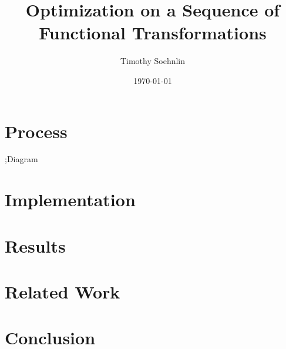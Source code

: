 \documentclass{article}
\title{Optimization on a Sequence of Functional Transformations}
\author{Timothy Soehnlin}
\date{\today}
\begin{document}
\maketitle





\section{Process}

;Diagram

\section{Implementation}

\section{Results}

\section{Related Work}

\section{Conclusion}
\end{document}
